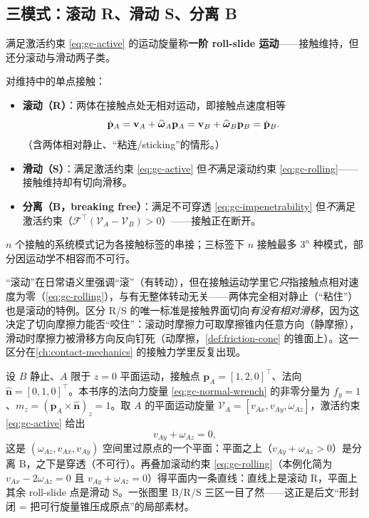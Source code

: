 \subsection{三模式：滚动 R、滑动 S、分离 B}
\label{sec:gc-rsb}

满足激活约束 \cref{eq:gc-active} 的运动旋量称\textbf{一阶 roll-slide 运动}——接触维持，但还分滚动与滑动两子类。

\begin{definition}[接触模式 R/S/B]
\label{def:gc-rsb}
对维持中的单点接触：
\begin{itemize}
  \item \textbf{滚动（R）}：两体在接触点处无相对运动，即接触点速度相等
  \begin{equation}
    \dot{\mathbf{p}}_A=\mathbf{v}_A+\widehat{\boldsymbol{\omega}}_A\mathbf{p}_A=\mathbf{v}_B+\widehat{\boldsymbol{\omega}}_B\mathbf{p}_B=\dot{\mathbf{p}}_B.
    \label{eq:gc-rolling}
  \end{equation}
  （含两体相对静止、“粘连/sticking”的情形。）
  \item \textbf{滑动（S）}：满足激活约束 \cref{eq:gc-active} 但\emph{不}满足滚动约束 \cref{eq:gc-rolling}——接触维持却有切向滑移。
  \item \textbf{分离（B，breaking free）}：满足不可穿透 \cref{eq:gc-impenetrability} 但\emph{不}满足激活约束（$\mathcal{F}^\top(\mathcal{V}_A-\mathcal{V}_B)>0$）——接触正在断开。
\end{itemize}
$n$ 个接触的系统模式记为各接触标签的串接；三标签下 $n$ 接触最多 $3^n$ 种模式，部分因运动学不相容而不可行。
\end{definition}

\begin{note}
“滚动”在日常语义里强调“滚”（有转动），但在接触运动学里它\emph{只}指接触点相对速度为零（\cref{eq:gc-rolling}），与有无整体转动无关——两体完全相对静止（“粘住”）也是滚动的特例。区分 R/S 的唯一标准是接触界面切向\emph{有没有相对滑移}，因为这决定了切向摩擦力能否“咬住”：滚动时摩擦力可取摩擦锥内任意方向（静摩擦），滑动时摩擦力被滑移方向反向钉死（动摩擦，\cref{def:friction-cone} 的锥面上）。这一区分在\cref{ch:contact-mechanics} 的接触力学里反复出现。
\end{note}

\begin{example}[平面单接触的三模式划分]
\label{ex:gc-single-contact}
设 $B$ 静止、$A$ 限于 $z=0$ 平面运动，接触点 $\mathbf{p}_A=[1,2,0]^\top$、法向 $\hat{\mathbf{n}}=[0,1,0]^\top$\cite{lynch2017modern}。本书序的法向力旋量 \cref{eq:gc-normal-wrench} 的非零分量为 $f_y=1$、$m_z=(\mathbf{p}_A\times\hat{\mathbf{n}})_z=1$。取 $A$ 的平面运动旋量 $\mathcal{V}_A=[v_{Ax},v_{Ay},\omega_{Az}]$，激活约束 \cref{eq:gc-active} 给出
\[
  v_{Ay}+\omega_{Az}=0,
\]
这是 $(\omega_{Az},v_{Ax},v_{Ay})$ 空间里过原点的一个平面：平面之上（$v_{Ay}+\omega_{Az}>0$）是分离 B，之下是穿透（不可行）。再叠加滚动约束 \cref{eq:gc-rolling}（本例化简为 $v_{Ax}-2\omega_{Az}=0$ 且 $v_{Ay}+\omega_{Az}=0$）得平面内一条直线：直线上是滚动 R，平面上其余 roll-slide 点是滑动 S。一张图里 B/R/S 三区一目了然——这正是后文“形封闭 = 把可行旋量锥压成原点”的局部素材。
\end{example}

